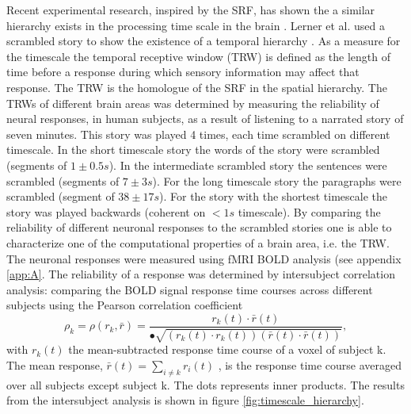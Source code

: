 Recent experimental research, inspired by the SRF, has shown the a similar hierarchy exists in the processing time scale in the brain \cite{hasson2008hierarchy, lerner2011topographic, honey2012slow}.
Lerner et al. used a scrambled story to show the existence of a temporal hierarchy \cite{lerner2011topographic}.
As a measure for the timescale the temporal receptive window (TRW) is defined as the length of time before a response during which sensory information may affect that response.
The TRW is the homologue of the SRF in the spatial hierarchy. 
The TRWs of different brain areas was determined by measuring the reliability of neural responses, in human subjects, as a result of listening to a narrated story of seven minutes.
This story was played 4 times, each time scrambled on  different timescale.
In the short timescale story the words of the story were scrambled (segments of $1 \pm 0.5 s$).
In the intermediate scrambled story the sentences were scrambled (segments of $7 \pm 3 s$). For the long timescale story the paragraphs were scrambled (segment of $38 \pm 17 s$).
For the story with the shortest timescale the story was played backwards (coherent on $<1 s$ timescale).
By comparing the reliability of different neuronal responses to the scrambled stories one is able to characterize one of the computational properties of a brain area, i.e. the TRW.
The neuronal responses were measured using fMRI BOLD analysis (see appendix \ref{app:A}.
The reliability of a response was determined by intersubject correlation analysis: comparing the BOLD signal response time courses across different subjects using the Pearson correlation coefficient
\begin{equation}\label{eq:intersubject_corrrelation}
\rho_k = \rho(r_k,\bar{r}) = \frac{r_k(t) \cdot \bar{r}(t)}{•\sqrt{(r_k(t) \cdot r_k(t))(\bar{r}(t) \cdot \bar{r} (t))}},
\end{equation}
with $r_k(t)$ the mean-subtracted response time course of a voxel of subject k.
The mean response, $\bar{r}(t)=\sum_{i\neq k} r_i(t)$ , is the response time course averaged over all subjects except subject k.
The dots represents inner products.
The results from the intersubject analysis is shown in figure \ref{fig:timescale_hierarchy}.

